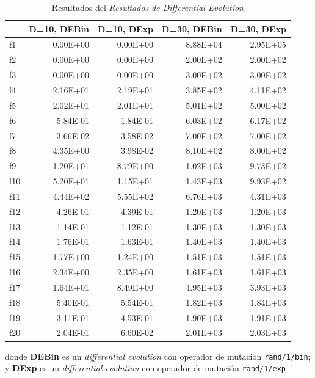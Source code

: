 \documentclass[a4paper,11pt]{article}
\begin{document}
  \begin{table}[H]	
  \caption{Resultados del \textit{Resultados de Differential Evolution}}
  \centering
  \begin{tabular}{|l|r|r|r|r|}
  \hline
     & \textbf{D=10, DEBin} & \textbf{D=10, DExp} & \textbf{D=30, DEBin} & \textbf{D=30, DExp}\\ \hline
  f1 & 0.00E+00 & 0.00E+00 & 8.88E+04 & 2.95E+05 \\ \hline
  f2 & 0.00E+00 & 0.00E+00 & 2.00E+02 & 2.00E+02 \\ \hline
  f3 & 0.00E+00 & 0.00E+00 & 3.00E+02 & 3.00E+02 \\ \hline
  f4 & 2.16E+01 & 2.19E+01 & 3.85E+02 & 4.11E+02 \\ \hline
  f5 & 2.02E+01 & 2.01E+01 & 5.01E+02 & 5.00E+02 \\ \hline
  f6 & 5.84E-01 & 1.84E-01 & 6.03E+02 & 6.17E+02 \\ \hline
  f7 & 3.66E-02 & 3.58E-02 & 7.00E+02 & 7.00E+02 \\ \hline
  f8 & 4.35E+00 & 3.98E-02 & 8.10E+02 & 8.00E+02 \\ \hline
  f9 & 1.20E+01 & 8.79E+00 & 1.02E+03 & 9.73E+02 \\ \hline
  f10 & 5.20E+01 & 1.15E+01 & 1.43E+03 & 9.93E+02 \\ \hline
  f11 & 4.44E+02 & 5.55E+02 & 6.76E+03 & 4.31E+03 \\ \hline
  f12 & 4.26E-01 & 4.39E-01 & 1.20E+03 & 1.20E+03 \\ \hline
  f13 & 1.14E-01 & 1.12E-01 & 1.30E+03 & 1.30E+03 \\ \hline
  f14 & 1.76E-01 & 1.63E-01 & 1.40E+03 & 1.40E+03 \\ \hline
  f15 & 1.77E+00 & 1.24E+00 & 1.51E+03 & 1.51E+03 \\ \hline
  f16 & 2.34E+00 & 2.35E+00 & 1.61E+03 & 1.61E+03 \\ \hline
  f17 & 1.64E+01 & 8.49E+00 & 4.95E+03 & 3.93E+03 \\ \hline
  f18 & 5.40E-01 & 5.54E-01 & 1.82E+03 & 1.84E+03 \\ \hline
  f19 & 3.11E-01 & 4.53E-01 & 1.90E+03 & 1.91E+03 \\ \hline
  f20 & 2.04E-01 & 6.60E-02 & 2.01E+03 & 2.03E+03 \\ \hline
  \end{tabular}
  \label{difev}
  \end{table}

  donde \textbf{DEBin} es un \textit{differential evolution} con operador de mutación \texttt{rand/1/bin}; y
  \textbf{DExp} es un \textit{differential evolution} con operador de mutación \texttt{rand/1/exp}
  
\end{document}

